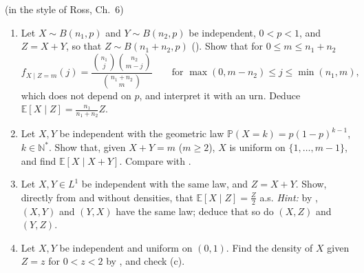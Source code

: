 \begin{exercise}\label{ex:ce-sums}
\medium (in the style of Ross, Ch.~6) \noindent
\begin{enumerate}[label=(\alph*)]
  \item Let $X\sim B(n_1,p)$ and $Y\sim B(n_2,p)$ be independent, $0<p<1$, and $Z=X+Y$, so that
    $Z\sim B(n_1+n_2,p)$ (). Show that for
    $0\le m\le n_1+n_2$
    \[
      f_{X\mid Z=m}(j)=\frac{\binom{n_1}j\binom{n_2}{m-j}}{\binom{n_1+n_2}m}
      \qquad\text{for }\max(0,m-n_2)\le j\le\min(n_1,m),
    \]
    which does not depend on $p$, and interpret it with an urn. Deduce
    $\mathbb E[X\mid Z]=\frac{n_1}{n_1+n_2}Z$.
  \item Let $X,Y$ be independent with the geometric law $\mathbb P(X=k)=p(1-p)^{k-1}$,
    $k\in\mathbb N^*$. Show that, given $X+Y=m$ ($m\ge2$), $X$ is uniform on
    $\{1,\dots,m-1\}$, and find $\mathbb E[X\mid X+Y]$. Compare with
    .
  \item Let $X,Y\in L^1$ be independent with the same law, and $Z=X+Y$. Show, directly from
     and without densities, that
    $\mathbb E[X\mid Z]=\frac Z2$ a.s. \emph{Hint:} by ,
    $(X,Y)$ and $(Y,X)$ have the same law; deduce that so do $(X,Z)$ and $(Y,Z)$.
  \item Let $X,Y$ be independent and uniform on $(0,1)$. Find the density of $X$ given $Z=z$ for
    $0<z<2$ by , and check (c).
\end{enumerate}
\end{exercise}

